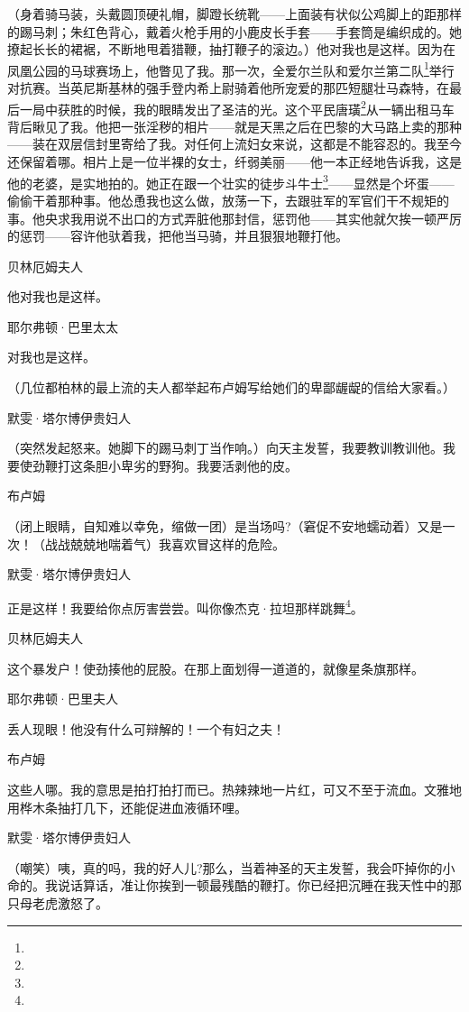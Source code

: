 \par （身着骑马装，头戴圆顶硬礼帽，脚蹬长统靴——上面装有状似公鸡脚上的距那样的踢马刺；朱红色背心，戴着火枪手用的小鹿皮长手套——手套筒是编织成的。她撩起长长的裙裾，不断地甩着猎鞭，抽打鞭子的滚边。）他对我也是这样。因为在凤凰公园的马球赛场上，他瞥见了我。那一次，全爱尔兰队和爱尔兰第二队\footnote{}举行对抗赛。当英尼斯基林的强手登内希上尉骑着他所宠爱的那匹短腿壮马森特，在最后一局中获胜的时候，我的眼睛发出了圣洁的光。这个平民唐璜\footnote{}从一辆出租马车背后瞅见了我。他把一张淫秽的相片——就是天黑之后在巴黎的大马路上卖的那种——装在双层信封里寄给了我。对任何上流妇女来说，这都是不能容忍的。我至今还保留着哪。相片上是一位半裸的女士，纤弱美丽——他一本正经地告诉我，这是他的老婆，是实地拍的。她正在跟一个壮实的徒步斗牛士\footnote{}——显然是个坏蛋——偷偷干着那种事。他怂恿我也这么做，放荡一下，去跟驻军的军官们干不规矩的事。他央求我用说不出口的方式弄脏他那封信，惩罚他——其实他就欠挨一顿严厉的惩罚——容许他驮着我，把他当马骑，并且狠狠地鞭打他。
\par 贝林厄姆夫人
\par 他对我也是这样。
\par 耶尔弗顿·巴里太太
\par 对我也是这样。
\par （几位都柏林的最上流的夫人都举起布卢姆写给她们的卑鄙龌龊的信给大家看。）
\par 默雯·塔尔博伊贵妇人
\par （突然发起怒来。她脚下的踢马刺丁当作响。）向天主发誓，我要教训教训他。我要使劲鞭打这条胆小卑劣的野狗。我要活剥他的皮。
\par 布卢姆
\par （闭上眼睛，自知难以幸免，缩做一团）是当场吗?（窘促不安地蠕动着）又是一次！（战战兢兢地喘着气）我喜欢冒这样的危险。
\par 默雯·塔尔博伊贵妇人
\par 正是这样！我要给你点厉害尝尝。叫你像杰克·拉坦那样跳舞\footnote{}。
\par 贝林厄姆夫人
\par 这个暴发户！使劲揍他的屁股。在那上面划得一道道的，就像星条旗那样。
\par 耶尔弗顿·巴里夫人
\par 丢人现眼！他没有什么可辩解的！一个有妇之夫！
\par 布卢姆
\par 这些人哪。我的意思是拍打拍打而已。热辣辣地一片红，可又不至于流血。文雅地用桦木条抽打几下，还能促进血液循环哩。
\par 默雯·塔尔博伊贵妇人
\par （嘲笑）咦，真的吗，我的好人儿?那么，当着神圣的天主发誓，我会吓掉你的小命的。我说话算话，准让你挨到一顿最残酷的鞭打。你已经把沉睡在我天性中的那只母老虎激怒了。
